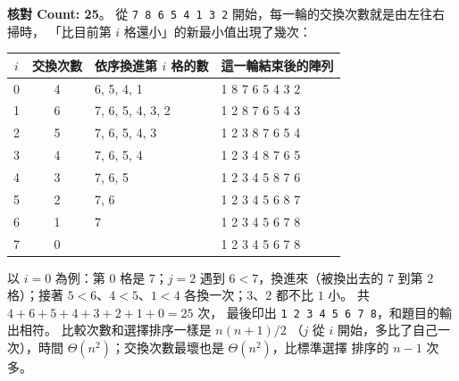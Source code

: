 \begin{pastsoln}
\textbf{核對 Count: 25}。 從 \texttt{7 8 6 5 4 1 3 2} 開始，每一輪的交換次數就是由左往右掃時，
「比目前第 $i$ 格還小」的新最小值出現了幾次：
\begin{center}
\small
\begin{tabular}{ccll}
\toprule
$i$ & 交換次數 & 依序換進第 $i$ 格的數 & 這一輪結束後的陣列 \\
\midrule
0 & 4 & 6, 5, 4, 1 & 1 8 7 6 5 4 3 2 \\
1 & 6 & 7, 6, 5, 4, 3, 2 & 1 2 8 7 6 5 4 3 \\
2 & 5 & 7, 6, 5, 4, 3 & 1 2 3 8 7 6 5 4 \\
3 & 4 & 7, 6, 5, 4 & 1 2 3 4 8 7 6 5 \\
4 & 3 & 7, 6, 5 & 1 2 3 4 5 8 7 6 \\
5 & 2 & 7, 6 & 1 2 3 4 5 6 8 7 \\
6 & 1 & 7 & 1 2 3 4 5 6 7 8 \\
7 & 0 & & 1 2 3 4 5 6 7 8 \\
\bottomrule
\end{tabular}
\end{center}
以 $i = 0$ 為例：第 $0$ 格是 $7$；$j = 2$ 遇到 $6 < 7$，換進來（被換出去的 $7$ 到第 $2$ 格）；接著
$5 < 6$、$4 < 5$、$1 < 4$ 各換一次；$3$、$2$ 都不比 $1$ 小。 共 $4 + 6 + 5 + 4 + 3 + 2 + 1 + 0 = 25$ 次，
最後印出 \texttt{1 2 3 4 5 6 7 8}，和題目的輸出相符。 比較次數和選擇排序一樣是 $n(n+1)/2$
（$j$ 從 $i$ 開始，多比了自己一次），時間 $\Theta(n^2)$；交換次數最壞也是 $\Theta(n^2)$，比標準選擇
排序的 $n - 1$ 次多。
\end{pastsoln}
